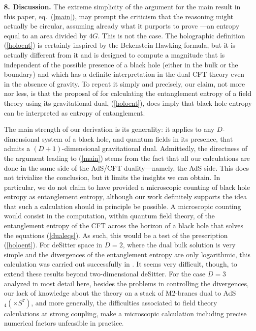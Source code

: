 \documentclass[12pt]{article}
\newcommand{\reef}[1]{(\ref{#1})}
\begin{document}
\bigskip


\noindent\textbf{8. Discussion.} The extreme simplicity of the argument
for the main result in this paper, eq.~\reef{main}, may prompt the
criticism that the reasoning might actually be circular, assuming already what
it purports to prove ---an entropy equal to an area divided by $4G$.
This is not the case. The holographic definition \reef{holoent} is
certainly inspired by the Bekenstein-Hawking formula, but it is actually
different from it and is designed to compute a magnitude that is
independent of the possible presence of a black hole (either in the bulk
or the boundary) and which has a definite interpretation in the dual CFT
theory even in the absence of gravity. To repeat it simply and precisely,
our claim, not more nor less, is that the proposal of \cite{ryta} for
calculating the entanglement entropy of a field theory using its
gravitational dual, \reef{holoent}, does imply that black hole entropy
can be interpreted as entropy of entanglement.

The main strength of our derivation is its generality: it applies to any
$D$-dimensional system of a black hole, and quantum fields in its
presence, that admits a $(D+1)$-dimensional gravitational dual.
Admittedly, the directness of the argument leading to \reef{main} stems
from the fact that all our calculations are done in the same side of the
AdS/CFT duality---namely, the AdS side. This does not trivialize the
conclusion, but it limits the insights we can obtain. In particular, we
do not claim to have provided a microscopic counting of black hole
entropy as entanglement entropy, although our work definitely supports
the idea that such a calculation should in principle be possible. A
microscopic counting would consist in the computation, within quantum
field theory, of the entanglement entropy of the CFT across the horizon
of a black hole that solves the equations \reef{dualeqs}. As such, this
would be a test of the prescription \reef{holoent}. For deSitter space
in $D=2$, where the dual bulk solution is very simple and the
divergences of the entanglement entropy are only logarithmic, this
calculation was carried out successfully in \cite{hms}. It seems very
difficult, though, to extend these results beyond two-dimensional
deSitter. For the case $D=3$ analyzed in most detail here, besides the
problems in controlling the divergences, our lack of knowledge about the
theory on a stack of M2-branes dual to AdS$_4 (\times S^7)$, and more
generally, the difficulties associated to field theory calculations at
strong coupling, make a microscopic calculation including precise
numerical factors unfeasible in practice. 
\end{document}
